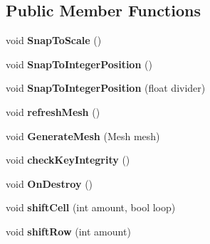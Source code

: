 \subsection*{Public Member Functions}
\begin{DoxyCompactItemize}
\item 
\hypertarget{class_rage_pixel_sprite_aa60b5d24d5f6c0be7bade68db5f8b075}{void {\bfseries Snap\-To\-Scale} ()}\label{class_rage_pixel_sprite_aa60b5d24d5f6c0be7bade68db5f8b075}

\item 
\hypertarget{class_rage_pixel_sprite_ae1059c4949d908e5f172d75b6a0096c0}{void {\bfseries Snap\-To\-Integer\-Position} ()}\label{class_rage_pixel_sprite_ae1059c4949d908e5f172d75b6a0096c0}

\item 
\hypertarget{class_rage_pixel_sprite_ae84dba5aa3632b2f461b3753f788ebf6}{void {\bfseries Snap\-To\-Integer\-Position} (float divider)}\label{class_rage_pixel_sprite_ae84dba5aa3632b2f461b3753f788ebf6}

\item 
\hypertarget{class_rage_pixel_sprite_a54896121f8e0fbbd29ff1c781ca3dfb2}{void {\bfseries refresh\-Mesh} ()}\label{class_rage_pixel_sprite_a54896121f8e0fbbd29ff1c781ca3dfb2}

\item 
\hypertarget{class_rage_pixel_sprite_a69d82f22f591cc8a77ae931fa3d38e75}{void {\bfseries Generate\-Mesh} (Mesh mesh)}\label{class_rage_pixel_sprite_a69d82f22f591cc8a77ae931fa3d38e75}

\item 
\hypertarget{class_rage_pixel_sprite_a56213f3932debdd80ae56f4b7e856d0e}{void {\bfseries check\-Key\-Integrity} ()}\label{class_rage_pixel_sprite_a56213f3932debdd80ae56f4b7e856d0e}

\item 
\hypertarget{class_rage_pixel_sprite_ad4d681e3606ad2f4837e040982dd4605}{void {\bfseries On\-Destroy} ()}\label{class_rage_pixel_sprite_ad4d681e3606ad2f4837e040982dd4605}

\item 
\hypertarget{class_rage_pixel_sprite_a26f052fdd8c540b3f55332683961bdd1}{void {\bfseries shift\-Cell} (int amount, bool loop)}\label{class_rage_pixel_sprite_a26f052fdd8c540b3f55332683961bdd1}

\item 
\hypertarget{class_rage_pixel_sprite_a49eab8b050d780696d4d26d156434ffb}{void {\bfseries shift\-Row} (int amount)}\label{class_rage_pixel_sprite_a49eab8b050d780696d4d26d156434ffb}


\end{DoxyCompactItemize}
